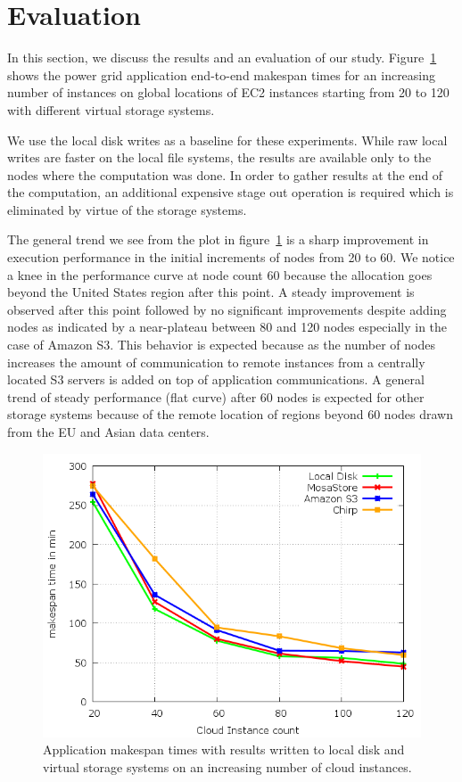 \documentclass{sig-alternate}
\begin{document}
\section{Evaluation} \label{sec:appresults}
In this section, we discuss the results and an evaluation of our study.
Figure~\ref{fig:makespan} shows the power grid application end-to-end
makespan times for an increasing number of instances on global locations of EC2
instances starting from 20 to 120 with different virtual storage systems. 

We use the local disk writes as a baseline for these experiments. While raw
local writes are faster on the local file systems, the
results are available only to the nodes where the computation was done. In
order to gather results at the end of the computation, an additional expensive
stage out operation is required which is eliminated by virtue of the storage
systems.

The general trend we see from the plot in figure~\ref{fig:makespan} is a sharp
improvement in execution performance in the initial increments of nodes from 20
to 60. We notice a knee in the performance curve at node count 60 because the
allocation goes beyond the United States region after this point. A steady
improvement is observed after this point followed by no significant
improvements despite adding nodes as indicated by a near-plateau between 80 and
120 nodes especially in the case of Amazon S3. This behavior is expected
because as the number of nodes increases the amount of communication to remote
instances from a centrally located S3 servers is added on top of application
communications. A general trend of steady performance (flat curve) after 60
nodes is expected for other storage systems because of the remote location of
regions beyond 60 nodes drawn from the EU and Asian data centers.

\begin{figure}[htb]
\begin{center}
\includegraphics[width=\linewidth]{plots/makespan.png}
\caption{Application makespan times with results written to local disk and
virtual storage systems on an increasing number of cloud instances.
\label{fig:makespan}
}
\end{center}
\end{figure}
\end{document}
